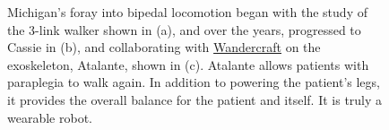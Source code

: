 \begin{figure}[htb]%
    \centering
{}%
\hspace{35pt}%
%
\centering
\hspace{35pt}%
%
    \caption[]{Michigan's foray into bipedal locomotion began with the study of the 3-link walker shown in (a), and over the years, progressed to Cassie in (b), and collaborating with \href{https://en.wandercraft.eu/}{Wandercraft} on the exoskeleton, Atalante, shown in (c). Atalante allows patients with paraplegia to walk again. In addition to powering the patient's legs, it provides the overall balance for the patient and itself. It is truly a wearable robot.}
    \label{fig:3LinkWalker}
\end{figure}

